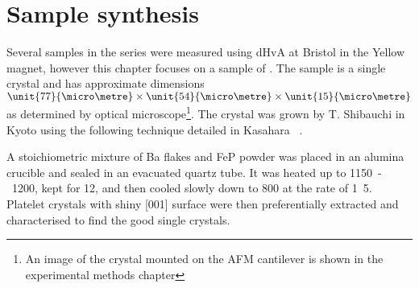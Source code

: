 \section{Sample synthesis}

Several samples in the \BaFeAsP{} series were measured using \ac{dHvA} at Bristol in the Yellow magnet, however this chapter focuses on a sample of \BaFeP. The sample is a single crystal and has approximate dimensions $\unit{77}{\micro\metre}\times\unit{54}{\micro\metre}\times \unit{15}{\micro\metre}$ as determined by optical microscope\footnote{An image of the crystal mounted on the \ac{AFM} cantilever is shown in the experimental methods chapter}. The crystal was grown by T. Shibauchi in Kyoto using the following technique detailed in Kasahara \etal~\cite{Kasahara2010}. 

A stoichiometric mixture of Ba flakes and FeP powder was placed in an alumina crucible and sealed in an evacuated quartz tube. It was heated up to \unit{1150-1200}{\celsius}, kept for \unit{12}{\hour}, and then cooled slowly down to \unit{800}{\celsius} at the rate of \unit{1.5}{\celsius\per\hour}. Platelet crystals with shiny [001] surface were then preferentially extracted and characterised to find the good single crystals.


